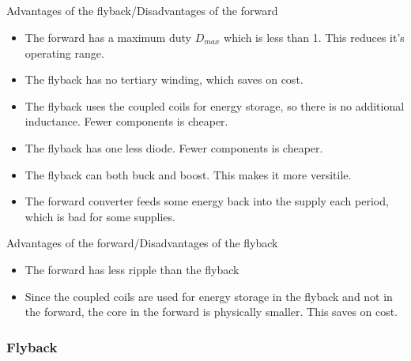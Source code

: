 \subsection{}

Advantages of the flyback/Disadvantages of the forward
\begin{itemize}
    \item The forward has a maximum duty $D_{max}$ which is less than 1. This reduces it's operating range.
    \item The flyback has no tertiary winding, which saves on cost.
    \item The flyback uses the coupled coils for energy storage, so there is no additional inductance. Fewer components is cheaper.
    \item The flyback has one less diode. Fewer components is cheaper.
    \item The flyback can both buck and boost. This makes it more versitile.
    \item The forward converter feeds some energy back into the supply each period, which is bad for some supplies.
\end{itemize}

Advantages of the forward/Disadvantages of the flyback
\begin{itemize}
    \item The forward has less ripple than the flyback
    \item Since the coupled coils are used for energy storage in the flyback and not in the forward, the core in the forward is physically smaller. This saves on cost.
\end{itemize}

\subsubsection*{Flyback}

